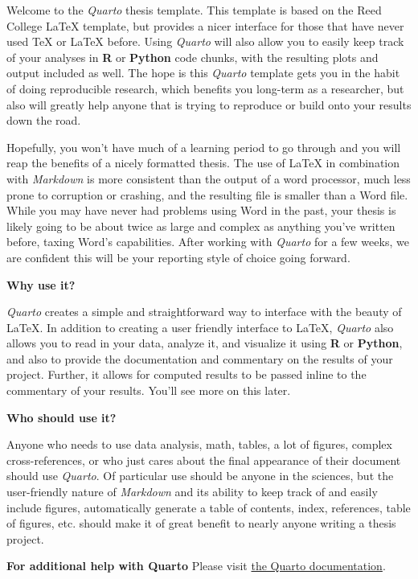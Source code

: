 \documentclass[
  letterpaper,
  12pt,
  twoside]{reedthesis}
\begin{document}
Welcome to the \emph{Quarto} thesis template. This template is based on
the Reed College LaTeX template, but provides a nicer interface for
those that have never used TeX or LaTeX before. Using \emph{Quarto} will
also allow you to easily keep track of your analyses in \textbf{R} or
\textbf{Python} code chunks, with the resulting plots and output
included as well. The hope is this \emph{Quarto} template gets you in
the habit of doing reproducible research, which benefits you long-term
as a researcher, but also will greatly help anyone that is trying to
reproduce or build onto your results down the road.

Hopefully, you won't have much of a learning period to go through and
you will reap the benefits of a nicely formatted thesis. The use of
LaTeX in combination with \emph{Markdown} is more consistent than the
output of a word processor, much less prone to corruption or crashing,
and the resulting file is smaller than a Word file. While you may have
never had problems using Word in the past, your thesis is likely going
to be about twice as large and complex as anything you've written
before, taxing Word's capabilities. After working with \emph{Quarto} for
a few weeks, we are confident this will be your reporting style of
choice going forward.

\textbf{Why use it?}

\emph{Quarto} creates a simple and straightforward way to interface with
the beauty of LaTeX. In addition to creating a user friendly interface
to LaTeX, \emph{Quarto} also allows you to read in your data, analyze
it, and visualize it using \textbf{R} or \textbf{Python}, and also to
provide the documentation and commentary on the results of your project.
Further, it allows for computed results to be passed inline to the
commentary of your results. You'll see more on this later.

\textbf{Who should use it?}

Anyone who needs to use data analysis, math, tables, a lot of figures,
complex cross-references, or who just cares about the final appearance
of their document should use \emph{Quarto}. Of particular use should be
anyone in the sciences, but the user-friendly nature of \emph{Markdown}
and its ability to keep track of and easily include figures,
automatically generate a table of contents, index, references, table of
figures, etc. should make it of great benefit to nearly anyone writing a
thesis project.

\textbf{For additional help with Quarto} Please visit
\href{https://quarto.org/docs/guide/}{the Quarto documentation}.
\end{document}
